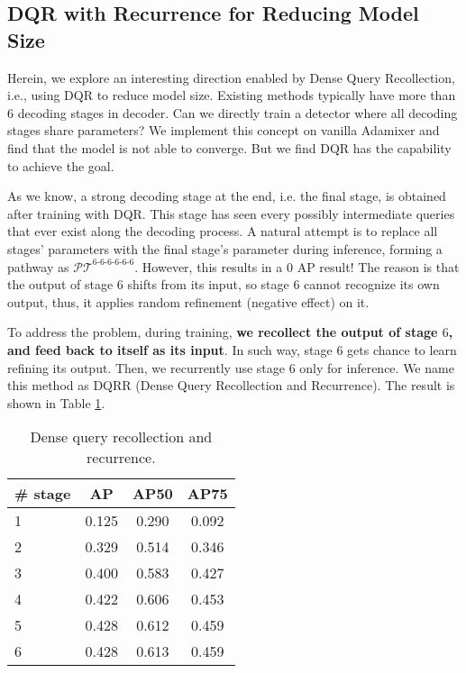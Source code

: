 \documentclass[10pt,twocolumn,letterpaper]{article}
\begin{document}
\subsection{DQR with Recurrence for Reducing Model Size}
Herein, we explore an interesting direction enabled by Dense Query Recollection, i.e., using DQR to reduce model size. Existing methods typically have more than 6 decoding stages in decoder. Can we directly train a detector where all decoding stages share parameters?  We implement this concept on vanilla Adamixer and find that the model is not able to converge. But we find DQR has the capability to achieve the goal.

As we know, a strong decoding stage at the end, i.e. the final stage, is obtained after training with DQR. This stage has seen every possibly intermediate queries that ever exist along the decoding process. A natural attempt is to replace all stages' parameters with the final stage's parameter during inference, forming a pathway as $\mathcal{PT}^{6\text{-}6\text{-}6\text{-}6\text{-}6\text{-}6}$. However, this results in a 0 AP result! The reason is that the output of stage $6$ shifts from its input, so stage $6$ cannot recognize its own output, thus, it applies random refinement (negative effect) on it.

To address the problem, during training, \textbf{we recollect the output of stage $6$, and feed back to itself as its input}. In such way, stage 6 gets chance to learn refining its output. Then, we recurrently use stage 6 only for inference. We name this method as DQRR (Dense Query Recollection and Recurrence). The result is shown in Table \ref{tab:DQRR}.

\begin{table}[t!]
\centering
    \begin{tabular}{l|c|c|c}
    \toprule[1pt]
        \# stage  &  AP & AP50 & AP75 \\
        \midrule
        1       & 0.125  & 0.290  &  0.092  \\
        2       & 0.329  & 0.514  &  0.346  \\
        3       & 0.400  & 0.583  &  0.427  \\
        4       & 0.422  & 0.606  &  0.453  \\
        5       & 0.428  &  0.612 &  0.459  \\
        6       & 0.428  &  0.613 &  0.459 \\
       \bottomrule
    \end{tabular}
    \caption{Dense query recollection and recurrence.}
    \label{tab:DQRR}
\end{table}
\end{document}
